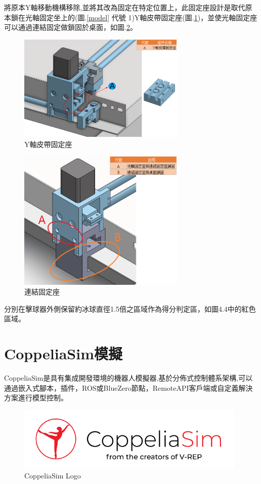 \documentclass[14pt,a4paper]{report}  %
\begin{document}
\qquad 將原本Y軸移動機構移除,並將其改為固定在特定位置上，此固定座設計是取代原本鎖在光軸固定坐上的(圖.\ref{model} 代號 1)Y軸皮帶固定座(圖.\ref{axialseat})，並使光軸固定座可以通過連結固定做鎖固於桌面，如圖.\ref{connectSeat}。\\

\begin{figure}[hbt!]
\center
\includegraphics[width=8cm]{axialseat}
\caption{\Large Y軸皮帶固定座}
\label{axialseat}
\end{figure}

\begin{figure}[hbt!]
\center
\includegraphics[width=8cm]{connectSeat}
\caption{\Large 連結固定座}
\label{connectSeat}
\end{figure}

\newpage
\qquad 分別在擊球器外側保留約冰球直徑1.5倍之區域作為得分判定區，如圖4.4中的紅色區域。\\
\section{CoppeliaSim模擬}
 CoppeliaSim是具有集成開發環境的機器人模擬器,基於分佈式控制體系架構,可以通過嵌入式腳本，插件，ROS或BlueZero節點，RemoteAPI客戶端或自定義解決方案進行模型控制。\\
 \begin{figure}[hbt!]
\center
\includegraphics[width=11cm]{CoppeliaSim}
\caption{\Large CoppeliaSim Logo}
\end{figure}
\end{document}
